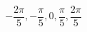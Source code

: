 \begin{displaymath}
 -\frac{2\pi}{5}, -\frac{\pi}{5}, 0, \frac{\pi}{5}, \frac{2\pi}{5}
\end{displaymath}
